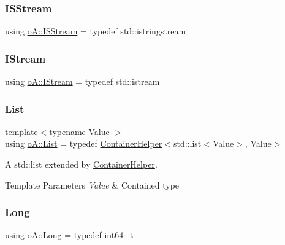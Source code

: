\mbox{\label{namespaceo_a_a60595f5d8b3d5dbbb9d1ed512917b09b}} 
\subsubsection{\texorpdfstring{I\+S\+Stream}{ISStream}}
{\footnotesize\ttfamily using \mbox{\hyperlink{namespaceo_a_a60595f5d8b3d5dbbb9d1ed512917b09b}{o\+A\+::\+I\+S\+Stream}} = typedef std\+::istringstream}

\mbox{\label{namespaceo_a_ae8cec630e608110423350d900ee22e73}} 
\subsubsection{\texorpdfstring{I\+Stream}{IStream}}
{\footnotesize\ttfamily using \mbox{\hyperlink{namespaceo_a_ae8cec630e608110423350d900ee22e73}{o\+A\+::\+I\+Stream}} = typedef std\+::istream}

\mbox{\label{namespaceo_a_a32faab7cf59b3e127611687f2b55b72e}} 
\subsubsection{\texorpdfstring{List}{List}}
{\footnotesize\ttfamily template$<$typename Value $>$ \\
using \mbox{\hyperlink{namespaceo_a_a32faab7cf59b3e127611687f2b55b72e}{o\+A\+::\+List}} = typedef \mbox{\hyperlink{classo_a_1_1_container_helper}{Container\+Helper}}$<$std\+::list$<$Value$>$, Value$>$}



A std\+::list extended by \mbox{\hyperlink{classo_a_1_1_container_helper}{Container\+Helper}}. 


\begin{DoxyTemplParams}{Template Parameters}
{\em Value} & Contained type \\
\hline
\end{DoxyTemplParams}
\mbox{\label{namespaceo_a_ab34d92c907da3ac86211277a1341c6c2}} 
\subsubsection{\texorpdfstring{Long}{Long}}
{\footnotesize\ttfamily using \mbox{\hyperlink{namespaceo_a_ab34d92c907da3ac86211277a1341c6c2}{o\+A\+::\+Long}} = typedef int64\+\_\+t}


